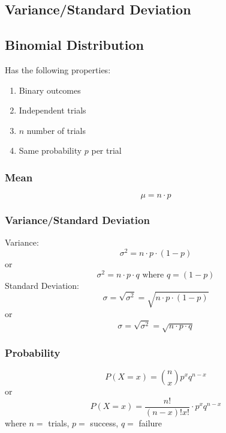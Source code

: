 \documentclass[13pt]{article}
\begin{document}
\subsection{Variance/Standard Deviation}


\subsection{Binomial Distribution}
Has the following properties:
\begin{enumerate}[label=(\roman*)]
\item Binary outcomes
\item Independent trials
\item $n$ number of trials
\item Same probability $p$ per trial
\end{enumerate}
\subsubsection{Mean} \[\mu = n \cdot p\]

\subsubsection{Variance/Standard Deviation}
Variance:
\[\sigma^2 = n \cdot p \cdot (1 - p)\]
or
\[\sigma^2 = n \cdot p \cdot q \text{ where } q = (1 - p)\]
Standard Deviation:
\[\sigma = \sqrt{\sigma^2} = \sqrt{n \cdot p \cdot (1 - p)}\]
or
\[\sigma = \sqrt{\sigma^2} = \sqrt{n \cdot p \cdot q}\]

\subsubsection{Probability}
\[P(X = x) = {n \choose x}p^{x}q^{n - x}\]
or
\[P(X = x) = \frac{n!}{(n - x)!x!} \cdot p^{x}q^{n - x}\]
where $n =$ trials, $p =$ success, $q=$ failure
\end{document}
